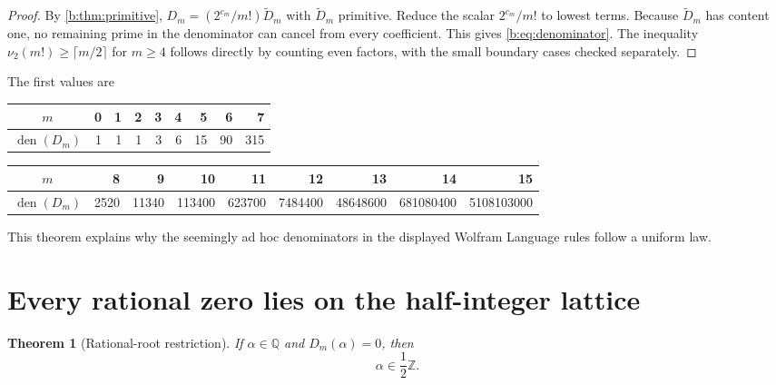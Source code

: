 \documentclass[11pt,a4paper,oneside,openany]{book}
\numberwithin{equation}{chapter}
\newtheorem{theorem}{Theorem}[chapter]
\theoremstyle{definition}
\theoremstyle{remark}
\newcommand{\Z}{\mathbb Z}
\newcommand{\Q}{\mathbb Q}
\newcommand{\vtwo}{\nu_2}
\newcommand{\Diag}{D}
\newcommand{\Dprim}{\widetilde D}
\begin{document}
\begin{proof}
By \cref{b:thm:primitive},
$\Diag_m=(2^{c_m}/m!)\Dprim_m$ with $\Dprim_m$ primitive.  Reduce the scalar
$2^{c_m}/m!$ to lowest terms.  Because $\Dprim_m$ has content one, no remaining
prime in the denominator can cancel from every coefficient.  This gives
\eqref{b:eq:denominator}.  The inequality
$\vtwo(m!)\ge\lceil m/2\rceil$ for $m\ge4$ follows directly by counting even
factors, with the small boundary cases checked separately.
\end{proof}

The first values are
\begin{center}
\small
\begin{tabular}{c|rrrrrrrr}
\toprule
$m$&0&1&2&3&4&5&6&7\\
\midrule
$\operatorname{den}(\Diag_m)$&1&1&1&3&6&15&90&315\\
\bottomrule
\end{tabular}

\medskip
\begin{tabular}{c|rrrrrrrr}
\toprule
$m$&8&9&10&11&12&13&14&15\\
\midrule
$\operatorname{den}(\Diag_m)$
&2520&11340&113400&623700&7484400&48648600&681080400&5108103000\\
\bottomrule
\end{tabular}
\end{center}
This theorem explains why the seemingly ad hoc denominators in the displayed
Wolfram Language rules follow a uniform law.

\section{Every rational zero lies on the half-integer lattice}

\begin{theorem}[Rational-root restriction]
\label{b:thm:rational-root-half}
If $\alpha\in\Q$ and $\Diag_m(\alpha)=0$, then
\begin{equation}
 \alpha\in\frac12\Z.
 \label{b:eq:rational-root-half}
\end{equation}
\end{theorem}
\end{document}
